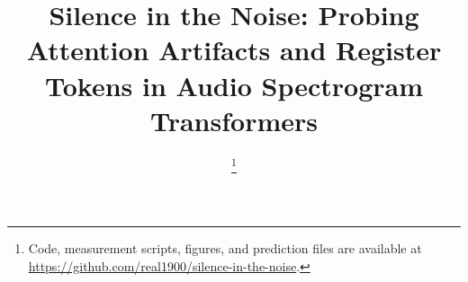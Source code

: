 \documentclass[conference]{IEEEtran}
\begin{document}
\title{Silence in the Noise: Probing Attention Artifacts and Register Tokens in Audio Spectrogram Transformers}

\author{
\thanks{Code, measurement scripts, figures, and prediction files are available at \url{https://github.com/real1900/silence-in-the-noise}.}
}

\maketitle

\begin{abstract}

\end{abstract}
\end{document}
